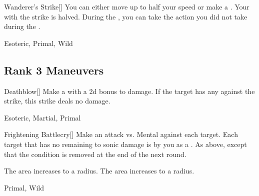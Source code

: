 \lowercase{\hypertarget{maneuver:Wanderer's Strike}{}}\label{maneuver:Wanderer's Strike}
\hypertarget{maneuver:Wanderer's Strike}{}
\begin{freeability}[Rank 2]{Wanderer's Strike}[]
You can either move up to half your speed or make a .
Your  with the strike is halved.
During the , you can take the action you did not take during the .


 Esoteric, Primal, Wild
\end{freeability}
\vspace{0.25em}


\subsection{Rank 3 Maneuvers}

\lowercase{\hypertarget{maneuver:Deathblow}{}}\label{maneuver:Deathblow}
\hypertarget{maneuver:Deathblow}{}
\begin{freeability}[Rank 3]{Deathblow}[]
Make a  with a \plus2d bonus to damage.
If the target has any  against the strike, this strike deals no damage.


 Esoteric, Martial, Primal
\end{freeability}
\vspace{0.25em}



\lowercase{\hypertarget{maneuver:Frightening Battlecry}{}}\label{maneuver:Frightening Battlecry}
\hypertarget{maneuver:Frightening Battlecry}{}
\begin{freeability}[Rank 3]{Frightening Battlecry}[]
Make an attack vs. Mental against each target.
\hit Each target that has no remaining  to sonic damage is  by you as a .
\glance As above, except that the condition is removed at the end of the next round.

\rankline
{} The area increases to a \areamed radius.
 The area increases to a \arealarge radius.


 Primal, Wild
\end{freeability}
\vspace{0.25em}



